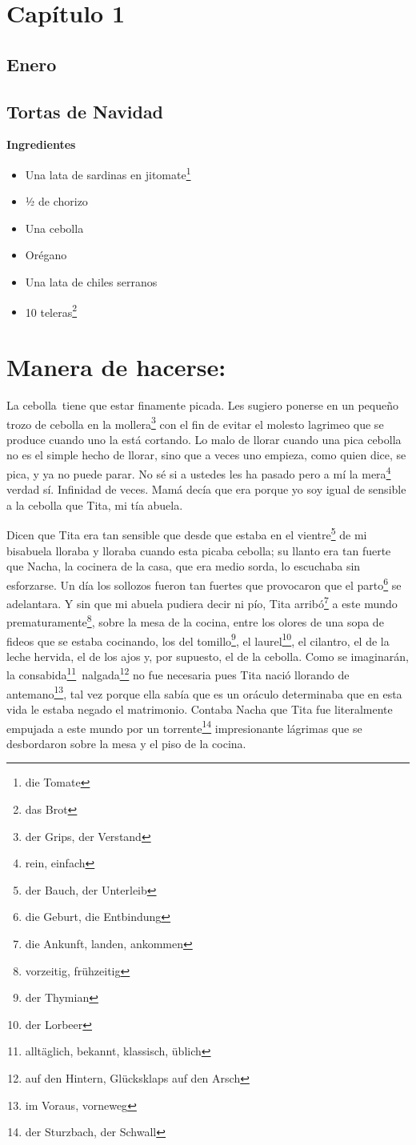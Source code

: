 \section*{ Capítulo 1 }
\subsection*{ Enero }
\subsection*{ Tortas de Navidad }
\textbf{Ingredientes}

\begin{itemize}
\item Una lata de sardinas en jitomate\footnote{die Tomate}
\item ½ de chorizo
\item Una cebolla
\item Orégano
\item Una lata de chiles serranos
\item 10 teleras\footnote{das Brot}
\end{itemize}

\section*{ Manera de hacerse:}
La cebolla~tiene que estar finamente picada. Les sugiero ponerse
en un pequeño trozo de cebolla en la mollera\footnote{der Grips, der Verstand}
con el fin de evitar el molesto lagrimeo que se produce cuando uno
la está cortando. Lo malo de llorar cuando una pica cebolla no es
el simple hecho de llorar, sino que a veces uno empieza, como quien dice,
se pica, y ya no puede parar. No sé si a ustedes les ha pasado pero a
mí la mera\footnote{rein, einfach} verdad sí. Infinidad de veces.
Mamá decía que era porque yo soy igual de sensible a la cebolla que
Tita, mi tía abuela.

Dicen que Tita era tan sensible que desde que estaba en
el vientre\footnote{der Bauch, der Unterleib} de mi
bisabuela lloraba y lloraba cuando esta picaba cebolla; su llanto era
tan fuerte que Nacha, la cocinera de la casa, que era medio sorda, lo
escuchaba sin esforzarse. Un día los sollozos fueron tan fuertes que
provocaron que el parto\footnote{die Geburt, die Entbindung} se
adelantara. Y sin que mi abuela pudiera decir ni pío, Tita arribó\footnote{die Ankunft, landen, ankommen} a
este mundo prematuramente\footnote{vorzeitig, frühzeitig},
sobre la mesa de la cocina, entre los olores de una sopa de fideos que
se estaba cocinando, los del tomillo\footnote{der Thymian}, el laurel\footnote{der Lorbeer}, el cilantro, el de la leche hervida,
el de los ajos y, por supuesto, el de la cebolla. Como se imaginarán, la consabida\footnote{alltäglich, bekannt, klassisch, üblich}~nalgada\footnote{auf den Hintern, Glücksklaps auf den Arsch} no
fue necesaria pues Tita nació llorando de antemano\footnote{im Voraus, vorneweg}, tal vez porque ella sabía
que es un oráculo determinaba que en esta vida le estaba negado el
matrimonio. Contaba Nacha que Tita fue literalmente empujada a este mundo
por un torrente\footnote{der Sturzbach, der Schwall} impresionante
lágrimas que se desbordaron sobre la mesa y el piso de la cocina.

